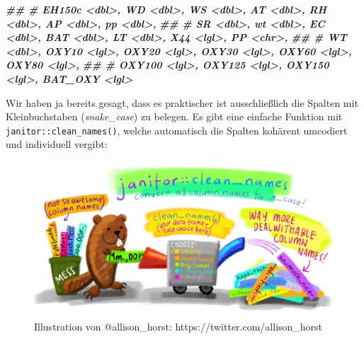 \documentclass[
]{article}
\newenvironment{Shaded}{\begin{snugshade}}{\end{snugshade}}
\newcommand{\DocumentationTok}[1]{\textcolor[rgb]{0.56,0.35,0.01}{\textbf{\textit{#1}}}}
\begin{document}
\begin{Shaded}
\begin{Highlighting}[]
\DocumentationTok{\#\# \#   EH150c \textless{}dbl\textgreater{}, WD \textless{}dbl\textgreater{}, WS \textless{}dbl\textgreater{}, AT \textless{}dbl\textgreater{}, RH \textless{}dbl\textgreater{}, AP \textless{}dbl\textgreater{}, pp \textless{}dbl\textgreater{},}
\DocumentationTok{\#\# \#   SR \textless{}dbl\textgreater{}, wt \textless{}dbl\textgreater{}, EC \textless{}dbl\textgreater{}, BAT \textless{}dbl\textgreater{}, LT \textless{}dbl\textgreater{}, X44 \textless{}lgl\textgreater{}, PP \textless{}chr\textgreater{},}
\DocumentationTok{\#\# \#   WT \textless{}dbl\textgreater{}, OXY10 \textless{}lgl\textgreater{}, OXY20 \textless{}lgl\textgreater{}, OXY30 \textless{}lgl\textgreater{}, OXY60 \textless{}lgl\textgreater{}, OXY80 \textless{}lgl\textgreater{},}
\DocumentationTok{\#\# \#   OXY100 \textless{}lgl\textgreater{}, OXY125 \textless{}lgl\textgreater{}, OXY150 \textless{}lgl\textgreater{}, BAT\_OXY \textless{}lgl\textgreater{}}
\end{Highlighting}
\end{Shaded}

Wir haben ja bereits gesagt, dass es praktischer ist ausschließlich die Spalten mit Kleinbuchstaben (\emph{snake\_case}) zu belegen. Es gibt eine einfache Funktion mit \texttt{janitor::clean\_names()}, welche automatisch die Spalten kohärent umcodiert und individuell vergibt:

\begin{figure}

{\centering \includegraphics[width=87.96in]{images/034} 

}

\caption{Illustration von @allison_horst: https://twitter.com/allison_horst}\label{fig:unnamed-chunk-110}
\end{figure}
\end{document}
